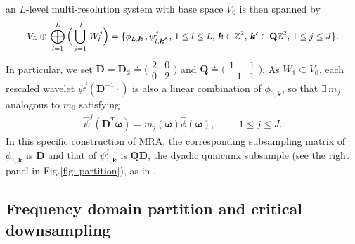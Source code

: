  an $L$-level multi-resolution system with base space $V_0$ is then spanned by
 \begin{align}\label{eq: MRA}
 V_L\oplus\,\bigoplus_{l=1}^L\Big(\bigcup_{j=1}^J\, W_l^j\Big) =
 \{\phi_{L,\boldsymbol{k}}\,,\psi^j_{l,\boldsymbol{k'}}\,, \, {\small 1\leq l \leq L,\, \boldsymbol{k}\in \mathbb{Z}^2,\,\boldsymbol{k'}\in \mathbf{Q}\mathbb{Z}^2,\,1\leq j \leq J\}}.
\end{align}  
In particular, we set $\mathbf{D} = \mathbf{D_2}\doteq\bigl(\begin{smallmatrix} 2&0\\0&2\end{smallmatrix}\bigr)$ and $\mathbf{Q}\doteq\bigl(\begin{smallmatrix} 1&1\\-1&1\end{smallmatrix}\bigr)$.
As $W_1\subset V_0$, each rescaled wavelet $\psi^j(\mathbf{D}^{-1}\cdot)$ is also a linear combination of $\phi_{0,\boldsymbol{k}}$, so that $\exists\, m_j$ analogous to $m_0$
satisfying 
\begin{align}\label{eq: mj}
\widehat{\psi}^j(\mathbf{D}^T\boldsymbol{\omega}) = m_j(\boldsymbol{\omega})\widehat{\phi}(\boldsymbol{\omega}),\hspace{1cm} 1\leq j \leq J.
\end{align}
In this specific construction of MRA,
 the corresponding subsampling matrix of $\phi_{1,\boldsymbol{k}}$ is $\mathbf{D}$ and that of $\psi^j_{1,\boldsymbol{k}}$ is $\mathbf{QD}$, the dyadic quincunx subsample (see the right panel in Fig.\ref{fig: partition}), as in \cite{durand2007}. 


\subsection{Frequency domain partition and critical downsampling}\label{subsec: frequency partition}



